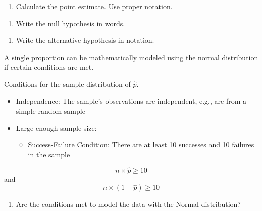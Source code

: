 \documentclass[
]{report}
\providecommand{\tightlist}{%
  \setlength{\itemsep}{0pt}\setlength{\parskip}{0pt}}
\begin{document}
\vspace{0.6in}

\begin{enumerate}
\def\labelenumi{\arabic{enumi}.}
\setcounter{enumi}{1}
\tightlist
\item
  Calculate the point estimate. Use proper notation.
\end{enumerate}

\vspace{0.3in}

\begin{enumerate}
\def\labelenumi{\arabic{enumi}.}
\setcounter{enumi}{2}
\tightlist
\item
  Write the null hypothesis in words.
\end{enumerate}

\vspace{0.6in}

\begin{enumerate}
\def\labelenumi{\arabic{enumi}.}
\setcounter{enumi}{3}
\tightlist
\item
  Write the alternative hypothesis in notation.
\end{enumerate}

\vspace{0.2in}

A single proportion can be mathematically modeled using the normal distribution if certain conditions are met.

Conditions for the sample distribution of \(\hat{p}\).

\begin{itemize}
\item
  Independence: The sample's observations are independent, e.g., are from a simple random sample
\item
  Large enough sample size:

  \begin{itemize}
  \tightlist
  \item
    Success-Failure Condition: There are at least 10 successes and 10 failures in the sample
  \end{itemize}
\end{itemize}

\[n \times \hat{p} \ge 10\] and \[n \times (1-\hat{p}) \ge 10\]

\newpage

\begin{enumerate}
\def\labelenumi{\arabic{enumi}.}
\setcounter{enumi}{4}
\tightlist
\item
  Are the conditions met to model the data with the Normal distribution?
\end{enumerate}
\end{document}

